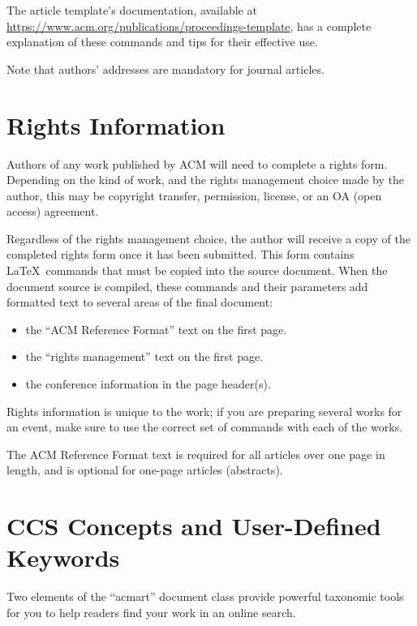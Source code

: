\documentclass[manuscript,screen,review]{acmart}
\providecommand{\tightlist}{%
  \setlength{\itemsep}{0pt}\setlength{\parskip}{0pt}}\usepackage{longtable,booktabs,array}
\begin{document}
The article template's documentation, available at
\url{https://www.acm.org/publications/proceedings-template}, has a
complete explanation of these commands and tips for their effective use.

Note that authors' addresses are mandatory for journal articles.

\hypertarget{rights-information}{%
\section{Rights Information}\label{rights-information}}

Authors of any work published by ACM will need to complete a rights
form. Depending on the kind of work, and the rights management choice
made by the author, this may be copyright transfer, permission, license,
or an OA (open access) agreement.

Regardless of the rights management choice, the author will receive a
copy of the completed rights form once it has been submitted. This form
contains \LaTeX~commands that must be copied into the source document.
When the document source is compiled, these commands and their
parameters add formatted text to several areas of the final document:

\begin{itemize}
\tightlist
\item
  the ``ACM Reference Format'' text on the first page.
\item
  the ``rights management'' text on the first page.
\item
  the conference information in the page header(s).
\end{itemize}

Rights information is unique to the work; if you are preparing several
works for an event, make sure to use the correct set of commands with
each of the works.

The ACM Reference Format text is required for all articles over one page
in length, and is optional for one-page articles (abstracts).

\hypertarget{ccs-concepts-and-user-defined-keywords}{%
\section{CCS Concepts and User-Defined
Keywords}\label{ccs-concepts-and-user-defined-keywords}}

Two elements of the ``acmart'' document class provide powerful taxonomic
tools for you to help readers find your work in an online search.
\end{document}
